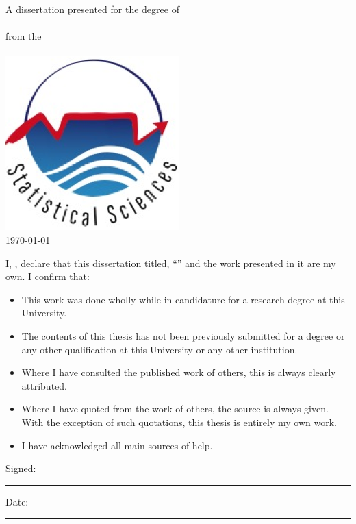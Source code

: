\documentclass[
12pt, %
english, %
singlespacing, %
parskip, %
headsepline, %
openany,
]{MastersDoctoralThesis} %
\numberwithin{theorem}{section}
\numberwithin{remark}{section}
\numberwithin{assumption}{section}
\begin{document}
\begin{titlepage}
\begin{center}
\large {A dissertation presented for the degree of \\ \degreename \ }\\[0.3cm] %
{from the}\\[0.4cm]
\deptname\\[1cm] %
\includegraphics*[width=0.25\linewidth]{Figures/statslogo.png} \\[1cm]
{\large \today}\\[4cm] %
 
\vfill
\end{center}
\end{titlepage}



\begin{declaration}
\addchaptertocentry{\authorshipname} 
\vspace{1.5cm}

\noindent I, \authorname, declare that this dissertation titled, \enquote{\ttitle} and the work presented in it are my own. I confirm that:

\begin{itemize} 
\item This work was done wholly while in candidature for a research degree at this University.
\item The contents of this thesis has not been previously submitted for a degree or any other qualification at this University or any other institution.
\item Where I have consulted the published work of others, this is always clearly attributed.
\item Where I have quoted from the work of others, the source is always given. With the exception of such quotations, this thesis is entirely my own work.
\item I have acknowledged all main sources of help.
\end{itemize}

\vspace{1cm}
\noindent Signed:\\
\rule[0.5em]{25em}{0.5pt} %
 
\noindent Date:\\
\rule[0.5em]{25em}{0.5pt} %
\end{declaration}
\end{document}
